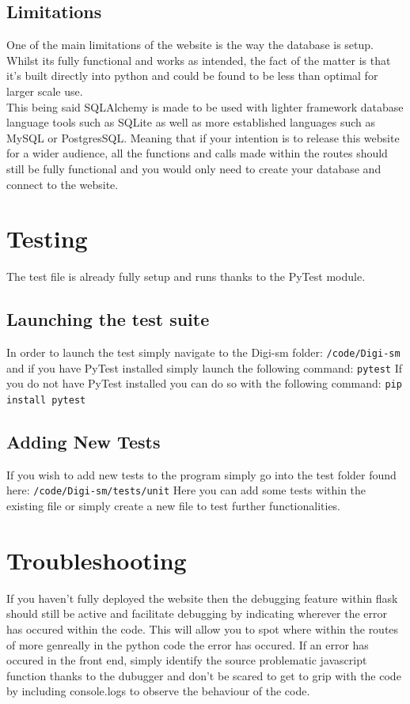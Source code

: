 \documentclass{article}
\begin{document}
\subsection{Limitations}
One of the main limitations of the website is the way the database is setup.
Whilst its fully functional and works as intended, the fact of the matter is that it's built directly into python and could be found to be less than optimal for larger scale use.\\
This being said SQLAlchemy is made to be used with lighter framework database language tools such as SQLite as well as more established languages such as MySQL or PostgresSQL. Meaning that if your intention is to release this website for a wider audience, all the functions and calls made within the routes should still be fully functional and you would only need to create your database and connect to the website.

\section{Testing}

The test file is already fully setup and runs thanks to the PyTest module.

\subsection{Launching the test suite}

In order to launch the test simply navigate to the Digi-sm folder:
\verb|/code/Digi-sm|
and if you have PyTest installed simply launch the following command:
\verb|pytest|
If you do not have PyTest installed you can do so with the following command:
\verb|pip install pytest|

\subsection{Adding New Tests}
If you wish to add new tests to the program simply go into the test folder found here:
\verb|/code/Digi-sm/tests/unit|
Here you can add some tests within the existing file or simply create a new file to test further functionalities.



\section{Troubleshooting}

If you haven't fully deployed the website then the debugging feature within flask should still be active and facilitate debugging by indicating wherever the error has occured within the code.
This will allow you to spot where within the routes of more genreally in the python code the error has occured. 
If an error has occured in the front end, simply identify the source problematic javascript function thanks to the dubugger and don't be scared to get to grip with the code by including console.logs to observe the behaviour of the code.
\end{document}
